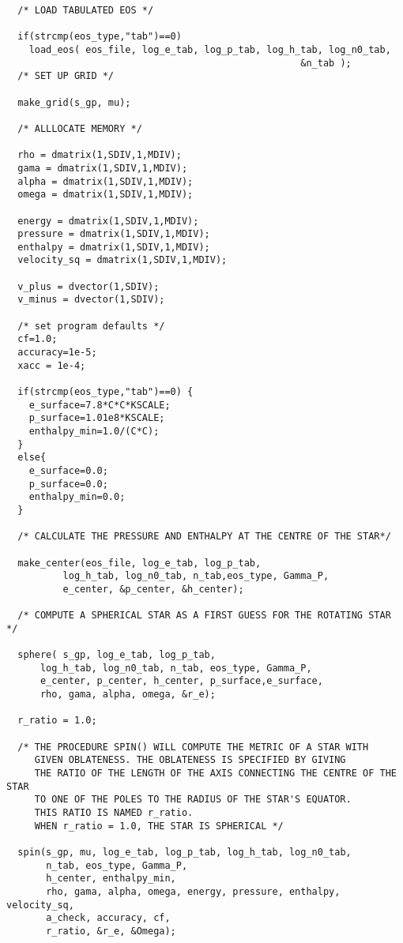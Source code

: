 \begin{verbatim}
  /* LOAD TABULATED EOS */ 

  if(strcmp(eos_type,"tab")==0) 
    load_eos( eos_file, log_e_tab, log_p_tab, log_h_tab, log_n0_tab, 
                                                    &n_tab );
  /* SET UP GRID */

  make_grid(s_gp, mu);

  /* ALLLOCATE MEMORY */

  rho = dmatrix(1,SDIV,1,MDIV);
  gama = dmatrix(1,SDIV,1,MDIV);
  alpha = dmatrix(1,SDIV,1,MDIV);
  omega = dmatrix(1,SDIV,1,MDIV);

  energy = dmatrix(1,SDIV,1,MDIV);
  pressure = dmatrix(1,SDIV,1,MDIV);
  enthalpy = dmatrix(1,SDIV,1,MDIV);
  velocity_sq = dmatrix(1,SDIV,1,MDIV);

  v_plus = dvector(1,SDIV);
  v_minus = dvector(1,SDIV);

  /* set program defaults */
  cf=1.0;
  accuracy=1e-5;    
  xacc = 1e-4;  
 
  if(strcmp(eos_type,"tab")==0) {
    e_surface=7.8*C*C*KSCALE;
    p_surface=1.01e8*KSCALE;
    enthalpy_min=1.0/(C*C);
  }
  else{
    e_surface=0.0;
    p_surface=0.0;
    enthalpy_min=0.0;
  }

  /* CALCULATE THE PRESSURE AND ENTHALPY AT THE CENTRE OF THE STAR*/

  make_center(eos_file, log_e_tab, log_p_tab, 
	      log_h_tab, log_n0_tab, n_tab,eos_type, Gamma_P, 
	      e_center, &p_center, &h_center);

  /* COMPUTE A SPHERICAL STAR AS A FIRST GUESS FOR THE ROTATING STAR */

  sphere( s_gp, log_e_tab, log_p_tab, 
	  log_h_tab, log_n0_tab, n_tab, eos_type, Gamma_P, 
	  e_center, p_center, h_center, p_surface,e_surface,
	  rho, gama, alpha, omega, &r_e);

  r_ratio = 1.0; 

  /* THE PROCEDURE SPIN() WILL COMPUTE THE METRIC OF A STAR WITH
     GIVEN OBLATENESS. THE OBLATENESS IS SPECIFIED BY GIVING 
     THE RATIO OF THE LENGTH OF THE AXIS CONNECTING THE CENTRE OF THE STAR 
     TO ONE OF THE POLES TO THE RADIUS OF THE STAR'S EQUATOR. 
     THIS RATIO IS NAMED r_ratio.
     WHEN r_ratio = 1.0, THE STAR IS SPHERICAL */

  spin(s_gp, mu, log_e_tab, log_p_tab, log_h_tab, log_n0_tab, 
       n_tab, eos_type, Gamma_P, 
       h_center, enthalpy_min,
       rho, gama, alpha, omega, energy, pressure, enthalpy, velocity_sq,
       a_check, accuracy, cf,
       r_ratio, &r_e, &Omega);
  

\end{verbatim}
